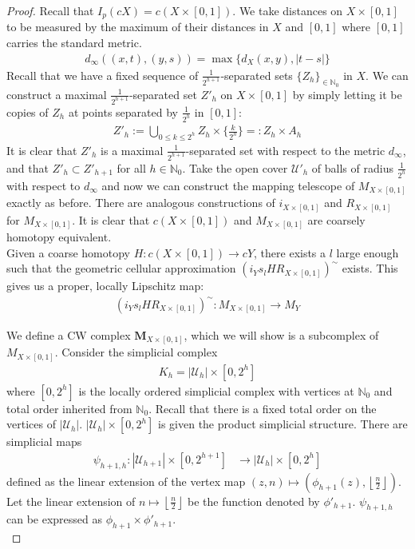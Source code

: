 \documentclass[a4paper,11pt]{article}
\theoremstyle{definition}
\theoremstyle{plain}
\theoremstyle{remark}
\begin{document}
{\begin{proof}

Recall that $I_{p}(cX) = c(X\times [0,1])$. We take distances on $X\times [0,1]$ to be measured by the maximum of their distances in $X$ and $[0,1]$ where $[0,1]$ carries the standard metric. 
\begin{align*}
d_{\infty}((x,t),(y,s)) = \max \{d_{X}(x,y), |t-s|\}
\end{align*} Recall that we have a fixed sequence of $\frac{1}{2^{h+1}}$-separated sets $\{Z_{h}\}_{\in \mathbb{N}_0}$ in $X$. We can construct a maximal $\frac{1}{2^{h+1}}$-separated set $Z'_{h}$ on $X\times [0,1]$  by simply letting it be copies of $Z_{h}$ at points separated by $\frac{1}{2^{h}}$ in $[0,1]$:
\begin{align*}
Z'_{h}:= \bigcup_{0\leq k\leq 2^h} Z_{h} \times \{ \frac{k}{2^{h}}\} =: Z_{h} \times  A_{h}
\end{align*}
It is clear that $Z'_{h}$ is a maximal $\frac{1}{2^{h+1}}$-separated set with respect to the metric $d_{\infty}$, and that $Z'_{h}\subset Z'_{h+1}$ for all $h\in \mathbb{N}_{0}$. Take the open cover $\mathcal{U}'_{h}$ of balls of radius $\frac{1}{2^h}$ with respect to $d_{\infty}$ and now we can construct the mapping telescope of $M_{X\times [0,1]}$ exactly as before. There are analogous constructions of $i_{X\times [0,1]}$ and $ R_{X\times [0,1]}$ for $M_{X\times [0,1]}$. It is clear that $c(X\times [0,1])$ and $M_{X\times [0,1]}$ are coarsely homotopy equivalent. \\

Given a coarse homotopy $H: c(X\times [0,1])\rightarrow cY$, there exists a $l$ large enough such that the geometric cellular approximation $(i_{Y}s_{l}HR_{X\times [0,1]})^{\sim}$ exists. This gives us a proper, locally Lipschitz map: 
\begin{align*}
(i_{Y}s_{l}HR_{X\times [0,1]})^{\sim}: M_{X\times [0,1]} \rightarrow M_{Y}
\end{align*}

We define a CW complex $\mathbf{M}_{X \times [0,1]}$, which we will show is a subcomplex of $M_{X \times [0,1]}$. Consider the simplicial complex
\begin{align*}
K_{h} =|\mathcal{U}_{h}| \times [0,2^h]
\end{align*}
where $[0,2^h]$ is the locally ordered simplicial complex with vertices at $\mathbb{N}_{0}$ and total order inherited from $\mathbb{N}_{0}$. Recall that there is a fixed total order on the vertices of $|\mathcal{U}_{h}|$. $|\mathcal{U}_{h}| \times [0,2^h]$ is given the product simplicial structure. There are simplicial maps
\begin{align*}
\psi_{h+1,h}: |\mathcal{U}_{h+1}| \times [0,2^{h+1}] &\rightarrow |\mathcal{U}_{h}| \times [0,2^{h}]
\end{align*}
defined as the linear extension of the vertex map $(z,n)\mapsto (\phi_{h+1}(z),\left \lfloor{\frac{n}{2}}\right\rfloor)$. Let the linear extension of $n\mapsto \left \lfloor{\frac{n}{2}}\right\rfloor$ be the function denoted by $\phi'_{h+1}$. $\psi_{h+1,h}$ can be expressed as $\phi_{h+1} \times \phi'_{h+1}$. \\


\end{proof}}
\end{document}

